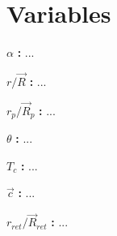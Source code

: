 \section{Variables}

\noindent ${\alpha}$ \textbf{:}
...

\noindent ${r} / {\vec{R}}$ \textbf{:}
...

\noindent ${r_p} / {\vec{R}_p}$ \textbf{:}
...

\noindent ${\theta}$ \textbf{:}
...

\noindent ${T_c}$ \textbf{:}
...

\noindent ${\vec{c}}$ \textbf{:}
...

\noindent ${r_{ret}} / {\vec{R}_{ret}}$ \textbf{:}
...